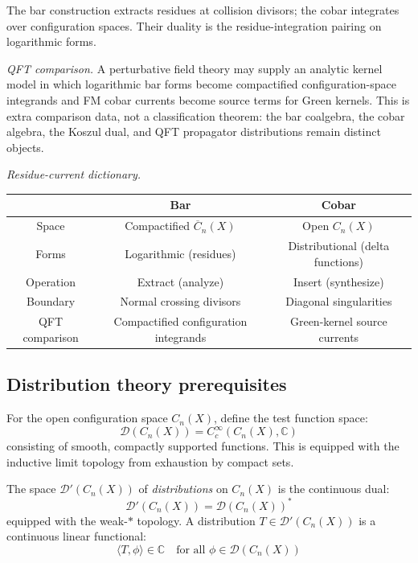 \begin{remark}
The bar construction extracts residues at collision divisors; the cobar integrates over configuration spaces. Their duality is the residue-integration pairing on logarithmic forms.

\emph{QFT comparison.}
A perturbative field theory may supply an analytic kernel model in
which logarithmic bar forms become compactified configuration-space
integrands and FM cobar currents become source terms for Green
kernels. This is extra comparison data, not a classification theorem:
the bar coalgebra, the cobar algebra, the Koszul dual, and QFT
propagator distributions remain distinct objects.

\emph{Residue-current dictionary.}
\begin{center}
\begin{tabular}{c|c|c}
& \textbf{Bar} & \textbf{Cobar} \\ \hline
Space & Compactified $\overline{C}_n(X)$ & Open $C_n(X)$ \\
Forms & Logarithmic (residues) & Distributional (delta functions) \\
Operation & Extract (analyze) & Insert (synthesize) \\
Boundary & Normal crossing divisors & Diagonal singularities \\
QFT comparison & Compactified configuration integrands & Green-kernel source currents \\
\end{tabular}
\end{center}
\end{remark}

\subsection{Distribution theory prerequisites}

\begin{definition}\label{def:test-functions}
For the open configuration space $C_n(X)$, define the test function space:
\[\mathcal{D}(C_n(X)) = C_c^\infty(C_n(X), \mathbb{C})\]
consisting of smooth, compactly supported functions. This is equipped with the
inductive limit topology from exhaustion by compact sets.
\end{definition}

\begin{definition}\label{def:distributions}
The space $\mathcal{D}'(C_n(X))$ of \emph{distributions} on $C_n(X)$ is the
continuous dual:
\[\mathcal{D}'(C_n(X)) = \mathcal{D}(C_n(X))^*\]
equipped with the weak-$*$ topology. A distribution $T \in \mathcal{D}'(C_n(X))$
is a continuous linear functional:
\[\langle T, \phi \rangle \in \mathbb{C} \quad \text{for all } \phi \in \mathcal{D}(C_n(X))\]
\end{definition}

